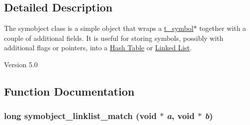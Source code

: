 \subsection{Detailed Description}
The symobject class is a simple object that wraps a \hyperlink{structt__symbol}{t\_\-symbol}$\ast$ together with a couple of additional fields. It is useful for storing symbols, possibly with additional flags or pointers, into a \hyperlink{group__hashtab}{Hash Table} or \hyperlink{group__linklist}{Linked List}.

\begin{DoxyVersion}{Version}
5.0 
\end{DoxyVersion}


\subsection{Function Documentation}
\hypertarget{group__symobject_gaff1afdf1da1b882e7314874bbf44921e}{
\subsubsection[{symobject\_\-linklist\_\-match}]{\setlength{\rightskip}{0pt plus 5cm}long symobject\_\-linklist\_\-match (void $\ast$ {\em a}, \/  void $\ast$ {\em b})}}
\label{group__symobject_gaff1afdf1da1b882e7314874bbf44921e}


